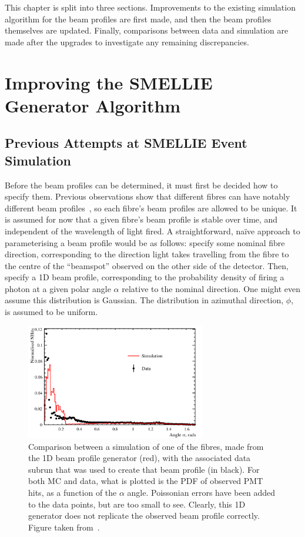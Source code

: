 This chapter is split into three sections. Improvements to the existing simulation algorithm for the beam profiles are first made, and then the beam profiles themselves are updated. Finally, comparisons between data and simulation are made after the upgrades to investigate any remaining discrepancies.


\section{Improving the SMELLIE Generator Algorithm}
\subsection{Previous Attempts at SMELLIE Event Simulation}
Before the beam profiles can be determined, it must first be decided how to specify them. Previous observations show that different fibres can have notably different beam profiles~\cite{majumdarMeasurementOpticalScattering2015}, so each fibre's beam profiles are allowed to be unique. It is assumed for now that a given fibre's beam profile is stable over time, and independent of the wavelength of light fired. A straightforward, na\"{i}ve approach to parameterising a beam profile would be as follows: specify some nominal fibre direction, corresponding to the direction light takes travelling from the fibre to the centre of the ``beamspot'' observed on the other side of the detector. Then, specify a 1D beam profile, corresponding to the probability density of firing a photon at a given polar angle $\alpha$ relative to the nominal direction. One might even assume this distribution is Gaussian. The distribution in azimuthal direction, $\phi$, is assumed to be uniform.

\begin{figure}
    \centering
    \includegraphics[width=0.7\textwidth]{4_SMELLIESimulation/images/1D_gen_plot.png}
    \caption[Comparison of SMELLIE between data and MC using a 1D generator]{Comparison between a simulation of one of the fibres, made from the 1D beam profile generator (red), with the associated data subrun that was used to create that beam profile (in black). For both MC and data, what is plotted is the PDF of observed PMT hits, as a function of the $\alpha$ angle. Poissonian errors have been added to the data points, but are too small to see. Clearly, this 1D generator does not replicate the observed beam profile correctly. Figure taken from~\cite{turnerMeasurementScatteringCharacteristics2022}.}
    \label{fig:1d_gen_plot}
\end{figure}

